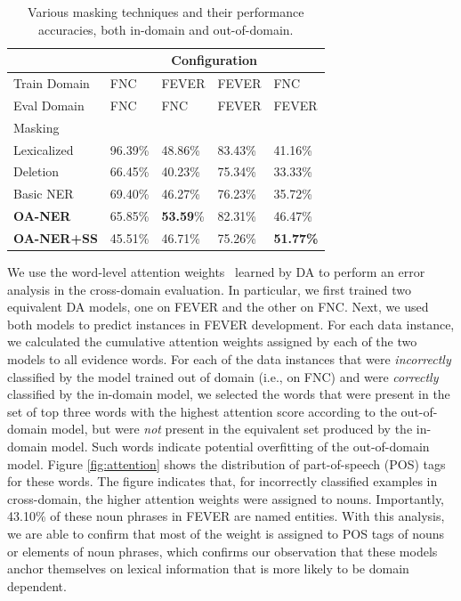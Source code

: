\begin{table}[ht]
\begin{center}
\begin{tabular}{p{22mm}|p{9mm}p{9mm}p{9mm}p{9mm}}
 & \multicolumn{4}{c}{Configuration} \\
 \hline
Train Domain & {FNC}& {FEVER}  & {FEVER} & {{FNC}} \\
Eval Domain & {FNC}& {{FNC}}  & {FEVER} & {{FEVER}} \\ \hline
Masking & & & & \\
\hline
Lexicalized &96.39\%& {48.86\%} &83.43\%& {41.16\%} \\
Deletion  &66.45\%& 40.23\% &75.34\%& 33.33\% \\
Basic NER &69.40\%& 46.27\% &76.23\%& 35.72\%\\
\textbf{OA-NER} &65.85\%& \textbf{53.59}\% &{82.31\%}& {46.47\%}\\
\textbf{OA-NER+SS} & 45.51\%& 46.71\% &75.26\%& {\bf 51.77\%}\\
\end{tabular}
\end{center}
    \caption{\label{crossdomain} Various masking techniques and their performance accuracies, both in-domain and out-of-domain.} \label{tab:results}

\end{table}
\label{attention_analysis}
We use the word-level attention weights~\citep{bahdanau2014neural} learned by DA to perform  an error analysis in the cross-domain evaluation.
In particular, we first trained two equivalent DA models, one on FEVER and the other on FNC.
Next, we used both models to predict instances in FEVER development. For each data instance, we calculated the cumulative attention weights assigned by each of the two models to all evidence words.
For each of the data instances that were {\em incorrectly} classified by the model trained out of domain (i.e., on FNC) and were {\em correctly} classified by the in-domain model,
we  selected the words that were present in the set of top three words with the highest attention score according to the out-of-domain model, but were {\em not} present in the equivalent set produced by the in-domain model. Such words indicate potential overfitting of the out-of-domain model.
Figure \ref{fig:attention} shows the distribution of part-of-speech (POS) tags for these words. The figure indicates that, for incorrectly classified examples in cross-domain, the higher attention weights were assigned to nouns.
Importantly, 43.10\% of these noun phrases in FEVER are named entities. With this analysis, we are able to confirm that most of the weight is assigned to POS tags of nouns or elements of noun phrases, which confirms our observation that these models anchor themselves on lexical information that is more likely to be domain dependent.

